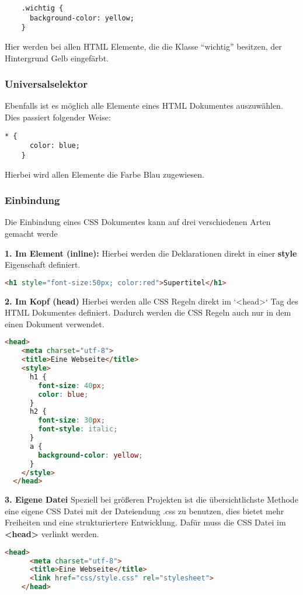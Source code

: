 \begin{lstlisting}
    .wichtig {
      background-color: yellow;
    }
\end{lstlisting}

Hier werden bei allen HTML Elemente, die die Klasse “wichtig” besitzen, der Hintergrund Gelb eingefärbt.

\subsubsection{Universalselektor}
Ebenfalls ist es möglich alle Elemente eines HTML Dokumentes auszuwählen. Dies passiert folgender Weise:

\begin{lstlisting}[caption=Universalselektor]
    * {
      color: blue;
    }
\end{lstlisting}

Hierbei wird allen Elemente die Farbe Blau zugewiesen.

\subsubsection{Einbindung}
Die Einbindung eines CSS Dokumentes kann auf drei verschiedenen Arten gemacht werde

\textbf{1. Im Element (inline):}
\newline
Hierbei werden die Deklarationen direkt in einer \textbf{style} Eigenschaft definiert.

\begin{lstlisting}[language=html]
    <h1 style="font-size:50px; color:red">Supertitel</h1>
\end{lstlisting}
\newpage
\textbf{2. Im Kopf (head)}
\newline
Hierbei werden alle CSS Regeln direkt im `<head>` Tag des HTML Dokumentes definiert. Dadurch werden die CSS Regeln auch nur in dem einen Dokument verwendet.

\begin{lstlisting}[language=html, caption=CSS Head Einbindung]
    <head>
    <meta charset="utf-8">
    <title>Eine Webseite</title>
    <style>
      h1 {
        font-size: 40px;
        color: blue;
      }
      h2 {
        font-size: 30px;
        font-style: italic;
      }
      a {
        background-color: yellow;
      }
    </style>
  </head>
\end{lstlisting}

\textbf{3. Eigene Datei}
\newline
Speziell bei größeren Projekten ist die übersichtlichste Methode eine eigene CSS Datei mit der Dateiendung .css zu benutzen, dies bietet mehr Freiheiten und eine strukturiertere Entwicklung. Dafür muss die CSS Datei im \textbf{<head>} verlinkt werden.

\begin{lstlisting}[language=html, caption=CSS Datei Einbindung]
    <head>
      <meta charset="utf-8">
      <title>Eine Webseite</title>
      <link href="css/style.css" rel="stylesheet">
    </head>
\end{lstlisting}

\cite{frontend_web_css}


